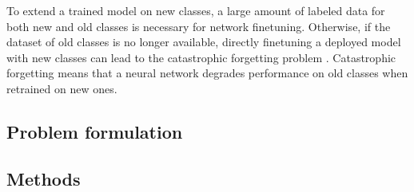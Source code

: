 To extend a trained model on new classes, a large amount of labeled data for both new
and old classes is necessary for network finetuning. Otherwise, if the dataset of old classes is no
longer available, directly finetuning a deployed model with
new classes can lead to the catastrophic forgetting
problem \cite{serra2018overcoming, zhang2021few, mccloskey1989catastrophic}. Catastrophic forgetting means that a neural network degrades performance on old classes when retrained on new ones.

\subsection{Problem formulation}


\subsection{Methods}



